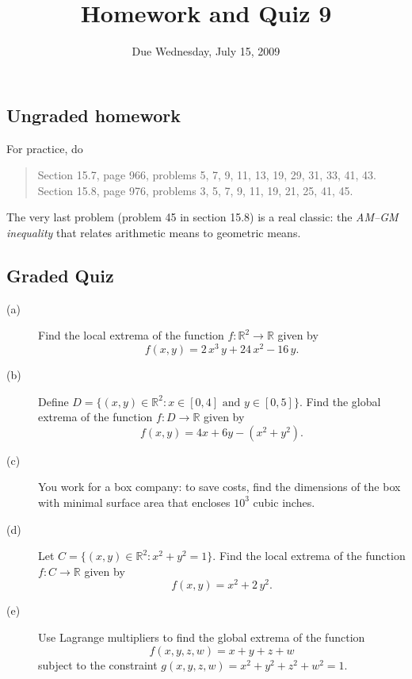 \documentclass[11pt]{article}
\title{Homework and Quiz 9}
\date{Due Wednesday, July 15, 2009}
\newcommand{\R}{\mathbb{R}}
\begin{document}
\maketitle

\subsection*{Ungraded homework}

For practice, do
\begin{quote}
  Section 15.7, page 966, problems 5, 7, 9, 11, 13, 19, 29, 31, 33, 41, 43. \\
  Section 15.8, page 976, problems 3, 5, 7, 9, 11, 19, 21, 25, 41, 45.
\end{quote}
The very last problem (problem 45 in section 15.8) is a real classic: the \textit{AM--GM inequality} that relates arithmetic means to geometric means.

\vfill

\subsection*{Graded Quiz}

\begin{description}
\item[(a)] Find the local extrema of the function $f : \R^2 \to \R$ given by
$$
f(x,y) = 2\,x^3\,y + 24\,x^2 - 16\,y.
$$
\vfill
\item[(b)] Define $D = \{(x,y) \in \R^2 : x \in [0,4] \mbox{ and } y \in [0,5]\}$.  Find the global extrema of the function $f : D \to \R$ given by
$$
f(x,y) = 4x + 6y - \left( x^2 + y^2 \right).
$$
\vfill
\item[(c)] You work for a box company: to save costs, find the
  dimensions of the box with minimal surface area that encloses $10^3$ cubic inches.\vfill
\item[(d)] Let $C = \{ (x,y) \in \R^2 : x^2 + y^2 = 1 \}$.  Find the
  local extrema of the function $f : C \to \R$ given by
$$
f(x,y) = x^2 + 2\,y^2.
$$
\vfill
\item[(e)] Use Lagrange multipliers to find the global extrema of the function
$$
f(x,y,z,w) = x+y+z+w
$$
subject to the constraint $g(x,y,z,w) = x^2 + y^2 + z^2 + w^2 = 1$.
\vfill
\end{description}
\end{document}
